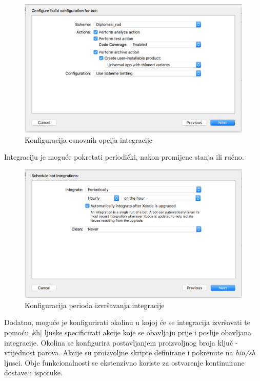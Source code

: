 \documentclass[times, utf8, diplomski, numeric]{fer}
\begin{document}
\begin{appendices}
\begin{figure}[h!]
    \centering
    \includegraphics[scale=0.5]{XcodeServerOptions}
    \caption{Konfiguracija osnovnih opcija integracije}
    \label{fig:XcodeServerOptions}
\end{figure}

Integraciju je moguće pokretati periodički, nakon promijene stanja ili ručno.

\begin{figure}
    \centering
    \includegraphics[scale=0.5]{XcodeServerIntegrationPeriods}
    \caption{Konfiguracija perioda izvršavanja integracije}
    \label{fig:XcodeServerIntegrationPeriods}
\end{figure}

Dodatno, moguće je konfigurirati okolinu u kojoj će se integracija izvršavati te pomoću \textit|sh| ljuske specificirati akcije koje se obavljaju prije i poslije obavljana integracije. Okolina se konfigurira postavljanjem proizvoljnog broja ključ - vrijednost parova. Akcije su proizvoljne skripte definirane i pokrenute na \textit{bin/sh} ljusci. Obje funkcionalnosti se ekstenzivno koriste za ostvarenje kontinuirane dostave i isporuke.


\end{appendices}
\end{document}
